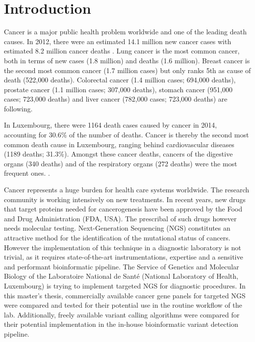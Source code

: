 \section{Introduction}

Cancer is a major public health problem worldwide and one of the leading death
causes. In 2012, there were an estimated 14.1 million new cancer cases with
estimated  8.2 million cancer deaths {\cite{cancer_stats_worldwide:2012}}. Lung
cancer is the most common cancer, both in terms of new cases (1.8 million) and
deaths (1.6 million). Breast  cancer is the second most common cancer (1.7
million cases) but only ranks 5th as cause of death (522,000 deaths). Colorectal
cancer (1.4 million cases; 694,000 deaths), prostate cancer (1.1 million cases;
307,000 deaths), stomach cancer (951,000 cases; 723,000 deaths) and liver cancer
(782,000 cases; 723,000 deaths) are following.

In Luxembourg, there were 1164 death cases caused by cancer in 2014, accounting
for 30.6\%  of the number of deaths. Cancer is thereby the second most common
death cause in Luxembourg, ranging behind cardiovascular diseases (1189 deaths;
31.3\%). Amongst these cancer deaths, cancers of the digestive organs (340 deaths)
and of the respiratory organs (272 deaths) were the most frequent ones.
{\cite{cancer_stats:2012}}.

Cancer represents a huge burden for health care systems worldwide. The research
community is working intensively on new treatments. In recent years, new drugs
that target proteins needed for cancerogenesis have been approved by the Food
and Drug Administration (FDA, USA). The prescribal of such drugs however needs
molecular testing. Next-Generation Sequencing (NGS) constitutes an attractive
method for the identification of the mutational status of cancers. However the
implementation of this technique  in a diagnostic laboratory is not trivial, as
it requires state-of-the-art instrumentations, expertise and a sensitive and
performant bioinformatic pipeline. The Service of Genetics and Molecular Biology
of the Laboratoire National de Santé (National Laboratory of Health, Luxembourg)
is trying to implement targeted NGS for diagnostic procedures.  In this master's
thesis, commercially available cancer gene panels for targeted NGS were compared
and tested for their potential use in the routine workflow of the lab.
Additionally, freely available variant calling algorithms were compared for
their potential implementation in the in-house bioinformatic variant detection
pipeline.

